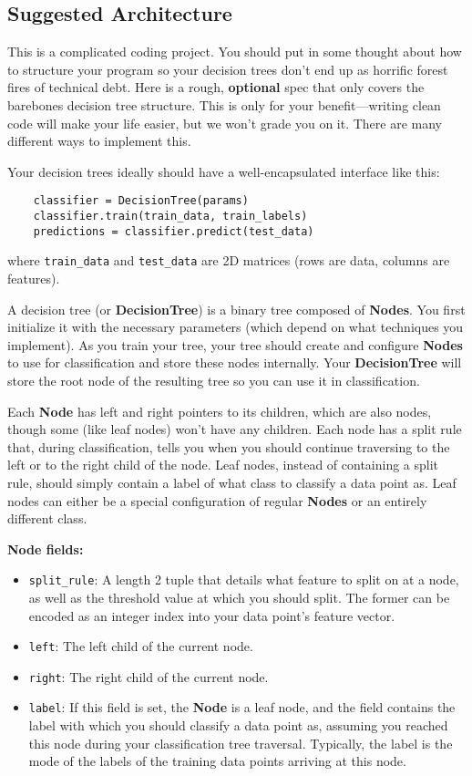 \subsection*{Suggested Architecture}
This is a complicated coding project. You should put in some thought about how to structure your program so your decision trees don't end up as horrific forest fires of technical debt. Here is a rough, \textbf{optional} spec that only covers the barebones decision tree structure. This is only for your benefit---writing clean code will make your life easier, but we won't grade you on it. There are many different ways to implement this.

Your decision trees ideally should have a well-encapsulated interface like this:

\begin{verbatim}
	classifier = DecisionTree(params)
	classifier.train(train_data, train_labels)
	predictions = classifier.predict(test_data)
\end{verbatim}

where \verb|train_data| and \verb|test_data| are 2D matrices (rows are data, columns are features).

A decision tree (or \textbf{DecisionTree}) is a binary tree composed of \textbf{Nodes}. You first initialize it with the necessary parameters (which depend on what techniques you implement). As you train your tree, your tree should create and configure \textbf{Nodes} to use for classification and store these nodes internally. Your \textbf{DecisionTree} will store the root node of the resulting tree so you can use it in classification.

Each \textbf{Node} has left and right pointers to its children, which are also nodes, though some (like leaf nodes) won't have any children. Each node has a split rule that, during classification, tells you when you should continue traversing to the left or to the right child of the node. Leaf nodes, instead of containing a split rule, should simply contain a label of what class to classify a data point as. Leaf nodes can either be a special configuration of regular \textbf{Nodes} or an entirely different class.

\textbf{Node fields:}
\begin{itemize}
	\item \verb|split_rule|: A length 2 tuple that details what feature to split on at a node, as well as the threshold value at which you should split. The former can be encoded as an integer index into your data point's feature vector.
	\item \verb|left|: The left child of the current node.
	\item \verb|right|: The right child of the current node.
	\item \verb|label|: If this field is set, the \textbf{Node} is a leaf node, and the field contains the label with which you should classify a data point as, assuming you reached this node during your classification tree traversal. Typically, the label is the mode of the labels of the training data points arriving at this node.
\end{itemize}

